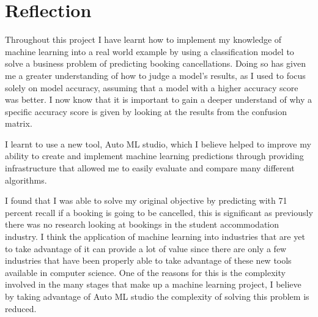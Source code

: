 \chapter{Reflection}
\label{ch:reflection}
Throughout this project I have learnt how to implement my knowledge of machine learning into a real world example by using a classification model to solve a business problem of predicting booking cancellations. Doing so has given me a greater understanding of how to judge a model's results, as I used to focus solely on model accuracy, assuming that a model with a higher accuracy score was better. I now know that it is important to gain a deeper understand of why a specific accuracy score is given by looking at the results from the confusion matrix. 

\vspace{5mm}

I learnt to use a new tool, Auto ML studio, which I believe helped to improve my ability to create and implement machine learning predictions through providing infrastructure that allowed me to easily evaluate and compare many different algorithms.

\vspace{5mm}

I found that I was able to solve my original objective by predicting with 71 percent recall if a booking is going to be cancelled, this is significant as previously there was no research looking at bookings in the student accommodation industry. I think the application of machine learning into industries that are yet to take advantage of it can provide a lot of value since there are only a few industries that have been properly able to take advantage of these new tools available in computer science. One of the reasons for this is the complexity involved in the many stages that make up a machine learning project, I believe by taking advantage of Auto ML studio the complexity of solving this problem is reduced. 
